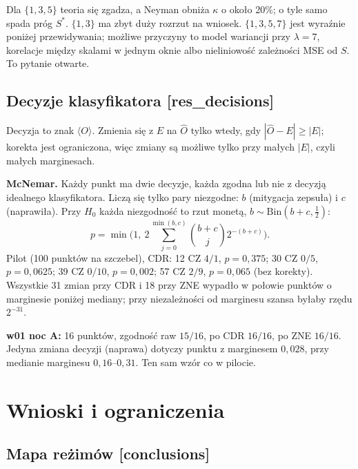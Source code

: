 \documentclass[11pt,a4paper]{article}
\newcommand{\slid}[1]{\hfill{\normalfont\small\ttfamily\color{axbluedk}[#1]}}
\newcommand{\ev}[1]{\langle #1\rangle}
\begin{document}
Dla $\{1,3,5\}$ teoria się zgadza, a Neyman obniża $\kappa$ o około 20\%; o tyle samo spada próg
$S^*$. $\{1,3\}$ ma zbyt duży rozrzut na wniosek. $\{1,3,5,7\}$ jest wyraźnie poniżej
przewidywania; możliwe przyczyny to model wariancji przy $\lambda=7$, korelacje między skalami w
jednym oknie albo nieliniowość zależności MSE od $S$. To pytanie otwarte.

\subsection{Decyzje klasyfikatora \slid{res\_decisions}}

Decyzja to znak $\ev O$. Zmienia się z $E$ na $\hat O$ tylko wtedy, gdy $|\hat O-E|\ge|E|$; korekta
jest ograniczona, więc zmiany są możliwe tylko przy małych $|E|$, czyli małych marginesach.

\textbf{McNemar.} Każdy punkt ma dwie decyzje, każda zgodna lub nie z decyzją idealnego
klasyfikatora. Liczą się tylko pary niezgodne: $b$ (mitygacja zepsuła) i $c$ (naprawiła). Przy $H_0$
każda niezgodność to rzut monetą, $b\sim\mathrm{Bin}(b+c,\frac12)$:
\[
  p=\min\Big(1,\ 2\sum_{j=0}^{\min(b,c)}\binom{b+c}j2^{-(b+c)}\Big).
\]
Pilot (100 punktów na szczebel), CDR: 12 CZ $4/1$, $p=0{,}375$; 30 CZ $0/5$, $p=0{,}0625$; 39 CZ
$0/10$, $p=0{,}002$; 57 CZ $2/9$, $p=0{,}065$ (bez korekty). Wszystkie 31 zmian przy CDR i 18 przy
ZNE wypadło w połowie punktów o marginesie poniżej mediany; przy niezależności od marginesu szansa
byłaby rzędu $2^{-31}$.

\textbf{w01 noc A:} 16 punktów, zgodność raw $15/16$, po CDR $16/16$, po ZNE $16/16$. Jedyna zmiana
decyzji (naprawa) dotyczy punktu z marginesem $0{,}028$, przy medianie marginesu $0{,}16$--$0{,}31$.
Ten sam wzór co w pilocie.

\section{Wnioski i ograniczenia}

\subsection{Mapa reżimów \slid{conclusions}}
\end{document}
